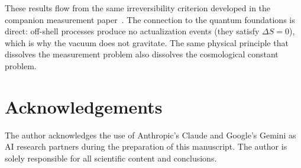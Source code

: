 \documentclass[11pt,twocolumn]{article}
\theoremstyle{plain}
\theoremstyle{remark}
\begin{document}
These results flow from the same irreversibility criterion
developed in the companion measurement paper~\cite{Sandeman2026P2}.
The connection to the quantum foundations is direct: off-shell
processes produce no actualization events (they satisfy $\Delta S = 0$),
which is why the vacuum does not gravitate.
The same physical principle that dissolves the measurement problem
also dissolves the cosmological constant problem.

\section*{Acknowledgements}
The author acknowledges the use of Anthropic's Claude and Google's
Gemini as AI research partners during the preparation of this
manuscript. The author is solely responsible for all scientific
content and conclusions.
\end{document}

